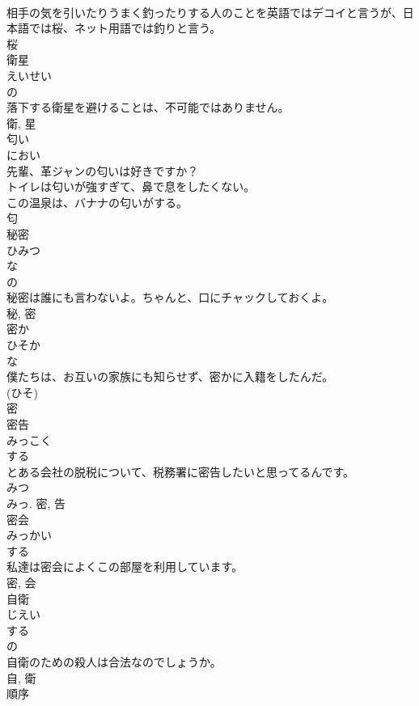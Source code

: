 \documentclass[8pt]{extreport}
\begin{document}
\begin{CJK}{UTF8}{min}
\\	相手の気を引いたりうまく釣ったりする人のことを英語ではデコイと言うが、日本語では桜、ネット用語では釣りと言う。	
\\	桜	
\\	衛星	
\\	えいせい	
\\	の 
\\	落下する衛星を避けることは、不可能ではありません。	
\\	衛, 星	
\\	匂い	
\\	におい	
\\	先輩、革ジャンの匂いは好きですか？	
\\	トイレは匂いが強すぎて、鼻で息をしたくない。	
\\	この温泉は、バナナの匂いがする。	
\\	匂	
\\	秘密	
\\	ひみつ	
\\	な 
\\	の 
\\	秘密は誰にも言わないよ。ちゃんと、口にチャックしておくよ。	
\\	秘, 密	
\\	密か	
\\	ひそか	
\\	な 
\\	僕たちは、お互いの家族にも知らせず、密かに入籍をしたんだ。	
\\	(ひそ) 
\\	密	
\\	密告	
\\	みっこく	
\\	する 
\\	とある会社の脱税について、税務署に密告したいと思ってるんです。	
\\	みつ 
\\	みっ.	密, 告	
\\	密会	
\\	みっかい	
\\	する 
\\	私達は密会によくこの部屋を利用しています。	
\\	密, 会	
\\	自衛	
\\	じえい	
\\	する 
\\	の 
\\	自衛のための殺人は合法なのでしょうか。	
\\	自, 衛	
\\	順序	

\end{CJK}
\end{document}

